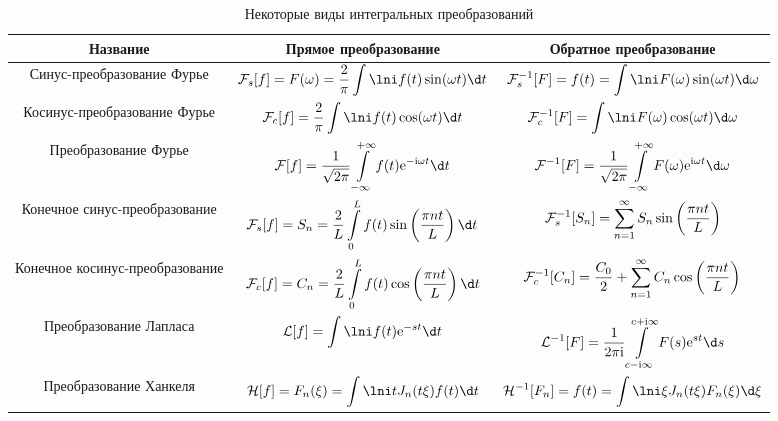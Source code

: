 \begin{table}[h!]
    \center
    \caption{Некоторые виды интегральных преобразований}
    \begin{tabular}{|C{.17}|C{.4}|C{.4}|} \hline
        Название & Прямое преобразование & Обратное преобразование \\ \hline
        Синус-преобразование Фурье &
        \( \ds
            \mathcal{F}_s[f] = F(\omega) =
            \frac{2}{\pi}\int\lni f(t)\sin(\omega t)\d t
        \)
        &
        \( \ds
            \mathcal{F}_s^{-1}[F] = f(t) =
            \int\lni F(\omega)\sin(\omega t)\d\omega
        \) \\ \hline
        Косинус-преобразование Фурье &
        \( \ds
            \mathcal{F}_c[f] = \frac{2}{\pi}\int\lni f(t)\cos(\omega t)\d t
        \)
        &
        \( \ds
            \mathcal{F}_c^{-1}[F] = \int\lni F(\omega)\cos(\omega t)\d\omega
        \) \\ \hline
        Преобразование Фурье &
        \( \ds
            \mathcal{F}[f] = \frac{1}{\sqrt{2\pi}}
            \int\limits_{-\infty}^{+\infty} f(t)\e^{-\i\omega t}\d t
        \)
        &
        \( \ds
            \mathcal{F}^{-1}[F] = \frac{1}{\sqrt{2\pi}}
            \int\limits_{-\infty}^{+\infty}F(\omega)\e^{\i\omega t}\d\omega
        \) \\ \hline
        Конечное синус-преобразование &
        \( \ds
            \mathcal{F}_s[f] = S_n = \frac{2}{L}\int\limits_0^L f(t)\sin\left(
            \frac{\pi nt}{L}\right)\d t
        \)
        &
        \( \displaystyle
            \mathcal{F}_s^{-1}[S_n] = \sum\limits_{n=1}^\infty S_n\sin\left(
            \frac{\pi nt}{L}\right)
        \) \\ \hline
        Конечное косинус-преобразование &
        \( \ds
            \mathcal{F}_c[f] = C_n = \frac{2}{L}\int\limits_0^L f(t)\cos\left(
            \frac{\pi nt}{L}\right)\d t
        \)
        &
        \( \displaystyle
            \mathcal{F}_c^{-1}[C_n] = \frac{C_0}{2} + \sum\limits_{n=1}^\infty
            C_n\cos\left(\frac{\pi nt}{L}\right)
        \) \\ \hline
        Преобразование Лапласа &
        \( \ds
            \mathcal{L}[f] = \int\lni f(t)\e^{-st}\d t
        \)
        &
        \( \ds
            \mathcal{L}^{-1}[F] = \frac{1}{2\pi\i}
            \int\limits_{c-\i\infty}^{c+\i\infty}F(s)\e^{st}\d s
        \) \\ \hline
        Преобразование Ханкеля &
        \( \ds
            \mathcal{H}[f] = F_n(\xi) = \int\lni tJ_n(t\xi)f(t)\d t
        \)
        &
        \( \ds
            \mathcal{H}^{-1}[F_n] = f(t) = \int\lni \xi J_n(t\xi)F_n(\xi)\d\xi
        \) \\ \hline
    \end{tabular}
\end{table}

